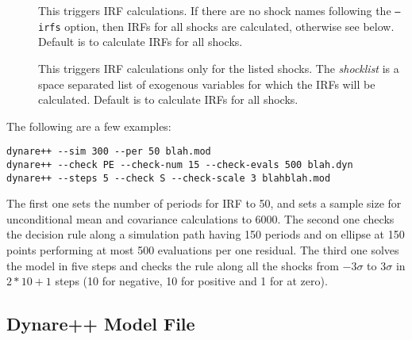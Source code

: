 \documentclass[10pt]{article}
\begin{document}
\begin{description}
\item[] This triggers IRF calculations. If there are
no shock names following the {\tt --irfs} option, then IRFs for all
shocks are calculated, otherwise see below. Default is to calculate
IRFs for all shocks.

\item[] This triggers IRF calculations
only for the listed shocks. The {\it shocklist} is a space separated
list of exogenous variables for which the IRFs will be
calculated. Default is to calculate IRFs for all shocks.
\end{description}

The following are a few examples:
{\small
\begin{verbatim}
dynare++ --sim 300 --per 50 blah.mod
dynare++ --check PE --check-num 15 --check-evals 500 blah.dyn
dynare++ --steps 5 --check S --check-scale 3 blahblah.mod
\end{verbatim}
}
The first one sets the number of periods for IRF to 50, and sets a sample
size for unconditional mean and covariance calculations to 6000. The
second one checks the decision rule along a simulation path having 150
periods and on ellipse at 150 points performing at most 500 evaluations
per one residual. The third one solves the model in five steps and
checks the rule along all the shocks from $-3\sigma$ to $3\sigma$ in
$2*10+1$ steps (10 for negative, 10 for positive and 1 for at zero).

\subsection{Dynare++ Model File}
\label{dynpp_mod}
\end{document}
